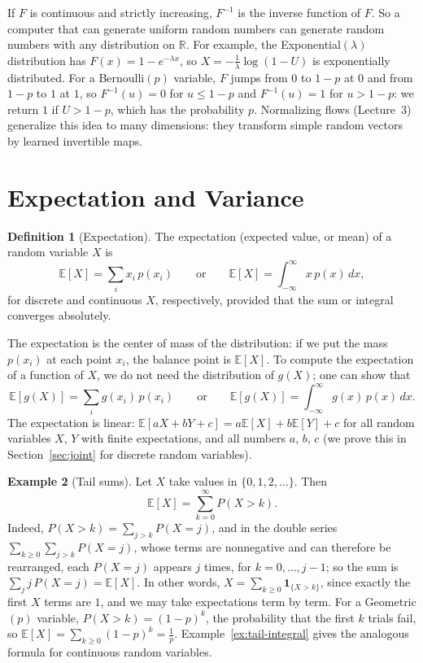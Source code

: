 \documentclass[11pt]{article}
\newcommand{\E}{\mathbb{E}}
\theoremstyle{definition}
\newtheorem{definition}{Definition}[section]
\newtheorem{example}[definition]{Example}
\theoremstyle{plain}
\theoremstyle{remark}
\begin{document}
If $F$ is continuous and strictly increasing, $F^{-1}$ is the inverse function of $F$. So a computer that can generate uniform random numbers can generate random numbers with any distribution on $\mathbb{R}$. For example, the Exponential$(\lambda)$ distribution has $F(x) = 1 - e^{-\lambda x}$, so $X = -\frac{1}{\lambda}\log(1 - U)$ is exponentially distributed. For a Bernoulli$(p)$ variable, $F$ jumps from $0$ to $1 - p$ at $0$ and from $1 - p$ to $1$ at $1$, so $F^{-1}(u) = 0$ for $u \leq 1 - p$ and $F^{-1}(u) = 1$ for $u > 1 - p$: we return $1$ if $U > 1 - p$, which has the probability $p$. Normalizing flows (Lecture~3) generalize this idea to many dimensions: they transform simple random vectors by learned invertible maps.

\section{Expectation and Variance}\label{sec:expectation}

\begin{definition}[Expectation]\label{def:expectation}
    The expectation (expected value, or mean) of a random variable $X$ is
    \[\E[X] = \sum_i x_i\,p(x_i) \qquad \text{or} \qquad \E[X] = \int_{-\infty}^\infty x\,p(x) \, dx,\]
    for discrete and continuous $X$, respectively, provided that the sum or integral converges absolutely.
\end{definition}

The expectation is the center of mass of the distribution: if we put the mass $p(x_i)$ at each point $x_i$, the balance point is $\E[X]$. To compute the expectation of a function of $X$, we do not need the distribution of $g(X)$; one can show that
\[\E[g(X)] = \sum_i g(x_i)\,p(x_i) \qquad \text{or} \qquad \E[g(X)] = \int_{-\infty}^\infty g(x)\,p(x) \, dx.\]
The expectation is linear: $\E[aX + bY + c] = a\E[X] + b\E[Y] + c$ for all random variables $X$, $Y$ with finite expectations, and all numbers $a$, $b$, $c$ (we prove this in Section~\ref{sec:joint} for discrete random variables).

\begin{example}[Tail sums]\label{ex:tail-sum}
    Let $X$ take values in $\{0, 1, 2, \ldots\}$. Then
    \[\E[X] = \sum_{k=0}^\infty P(X > k).\]
    Indeed, $P(X > k) = \sum_{j > k} P(X = j)$, and in the double series $\sum_{k \geq 0}\sum_{j > k} P(X = j)$, whose terms are nonnegative and can therefore be rearranged, each $P(X = j)$ appears $j$ times, for $k = 0, \ldots, j - 1$; so the sum is $\sum_j j\,P(X = j) = \E[X]$. In other words, $X = \sum_{k \geq 0}\mathbf{1}_{\{X > k\}}$, since exactly the first $X$ terms are $1$, and we may take expectations term by term. For a Geometric$(p)$ variable, $P(X > k) = (1 - p)^k$, the probability that the first $k$ trials fail, so $\E[X] = \sum_{k \geq 0}(1 - p)^k = \frac{1}{p}$. Example~\ref{ex:tail-integral} gives the analogous formula for continuous random variables.
\end{example}
\end{document}
